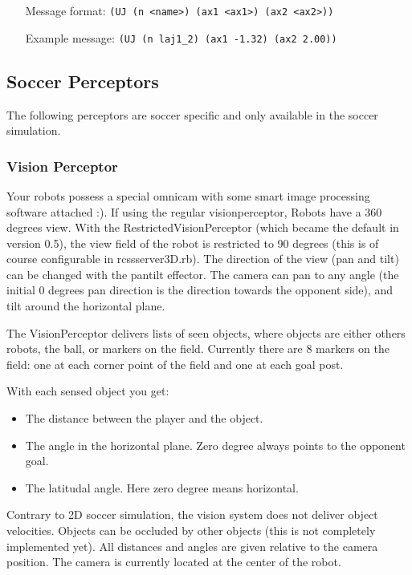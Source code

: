 \begin{itemize}
	\item[Message format:] \texttt{(UJ (n <name>) (ax1 <ax1>) (ax2 <ax2>))}
	\item[Example message:] \texttt{(UJ (n laj1\_2) (ax1 -1.32) (ax2 2.00))}
\end{itemize}

\subsection{Soccer Perceptors}
The following perceptors are soccer specific and only available in the soccer
simulation.

\subsubsection{Vision Perceptor}
Your robots possess a special omnicam with some smart image processing
software attached :). If using the regular visionperceptor, Robots
have a 360 degrees view. With the RestrictedVisionPerceptor (which
became the default in version 0.5), the view field of the robot is
restricted to 90 degrees (this is of course configurable in
rcssserver3D.rb). The direction of the view (pan and tilt) can be
changed with the pantilt effector. The camera can pan to any angle
(the initial 0 degrees pan direction is the direction towards the
opponent side), and tilt around the horizontal plane.

The VisionPerceptor delivers lists of seen objects, where objects are
either others robots, the ball, or markers on the field. Currently
there are 8 markers on the field: one at each corner point of the
field and one at each goal post.

With each sensed object you get:

\begin{itemize}
  \item The distance between the player and the object.
  \item The angle in the horizontal plane. Zero degree always points to the
opponent goal.
  \item The latitudal angle. Here zero degree means horizontal. 
\end{itemize}

Contrary to 2D soccer simulation, the vision system does not deliver
object velocities. Objects can be occluded by other objects (this is
not completely implemented yet). All distances and angles are given
relative to the camera position. The camera is currently located at
the center of the robot.

